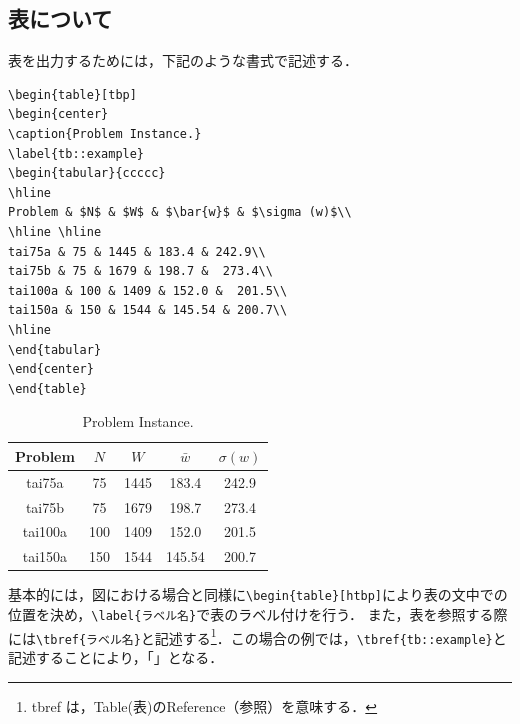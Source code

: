 \documentclass[a4j,titlepage]{jarticle}
\begin{document}
\subsection{表について}

表を出力するためには，下記のような書式で記述する．

\begin{screen}
\begin{verbatim}
\begin{table}[tbp]
\begin{center}
\caption{Problem Instance.}
\label{tb::example}
\begin{tabular}{ccccc}
\hline 
Problem & $N$ & $W$ & $\bar{w}$ & $\sigma (w)$\\
\hline \hline
tai75a & 75 & 1445 & 183.4 & 242.9\\
tai75b & 75 & 1679 & 198.7 &  273.4\\
tai100a & 100 & 1409 & 152.0 &  201.5\\
tai150a & 150 & 1544 & 145.54 & 200.7\\
\hline
\end{tabular}
\end{center}
\end{table}
\end{verbatim}
\end{screen}

\begin{table}[tbp]
\begin{center}
\caption{Problem Instance.}
\label{tb::example}
\begin{tabular}{c|cccc}
\hline 
Problem & $N$ & $W$ & $\bar{w}$ & $\sigma (w)$\\
\hline \hline
tai75a & 75 & 1445 & 183.4 & 242.9\\
tai75b & 75 & 1679 & 198.7 &  273.4\\
tai100a & 100 & 1409 & 152.0 &  201.5\\
tai150a & 150 & 1544 & 145.54 & 200.7\\
\hline
\end{tabular}
\end{center}
\end{table}


基本的には，図における場合と同様に\verb|\begin{table}[htbp]|により表の文中での位置を決め，\verb|\label{ラベル名}|で表のラベル付けを行う．
また，表を参照する際には\verb|\tbref{ラベル名}|と記述する\footnote{tbref は，Table(表)のReference（参照）を意味する．}．この場合の例では，\verb|\tbref{tb::example}|と記述することにより，「」となる．
\end{document}
